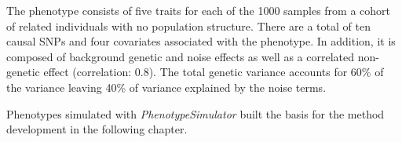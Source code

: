The phenotype consists of five traits for each of the \num{1000} samples from a cohort of related individuals with no population structure. There are a total of ten causal SNPs and four covariates associated with the phenotype. In addition, it is composed of background genetic and noise effects as well as a correlated non-genetic effect (correlation: \num{0.8}). The total genetic variance accounts for \num{60}\% of the variance leaving \num{40}\% of variance explained by the noise terms.

Phenotypes simulated with \textit{PhenotypeSimulator} built the basis for the method development in the following chapter.